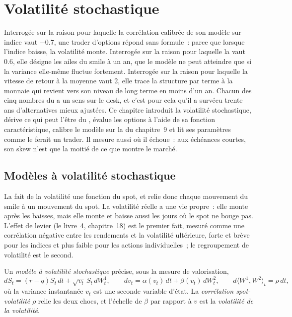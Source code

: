 \chapter{Volatilité stochastique}\label{ch:dv:stochastic-volatility}

Interrogée sur la raison pour laquelle la corrélation calibrée de son modèle sur indice vaut $-0.7$, une trader d'options répond
sans formule~: parce que lorsque l'indice baisse, la volatilité monte. Interrogée sur la raison pour laquelle la  vaut 0.6, elle désigne les ailes du smile à un an, que le modèle ne peut atteindre que si la variance elle-même fluctue fortement.
Interrogée sur la raison pour laquelle la vitesse de retour à la moyenne vaut 2, elle trace la
structure par terme à la monnaie qui revient vers son niveau de long terme en moins d'un an. Chacun des
cinq nombres du  a un sens sur le desk, et c'est pour cela qu'il a survécu
trente ans d'alternatives mieux ajustées. Ce chapitre introduit la volatilité stochastique,
dérive ce qui peut l'être du , évalue les options à l'aide de sa
fonction caractéristique, calibre le modèle sur la  du chapitre~9 et lit ses paramètres comme le ferait un trader.
Il mesure aussi où il échoue~: aux échéances courtes, son skew n'est que la moitié de
ce que montre le marché.

\section{Modèles à volatilité stochastique}

La  fait de la volatilité une fonction du spot, et relie donc chaque mouvement du smile à
un mouvement du spot. La volatilité réelle a une vie propre~: elle monte après les baisses, mais elle
monte et baisse aussi les jours où le spot ne bouge pas. L'effet de levier (le livre~4,
chapitre~18) est le premier fait, mesuré comme une corrélation négative entre les rendements et la
volatilité ultérieure, forte et brève pour les indices et plus faible pour les actions individuelles~; le regroupement de volatilité
est le second.

\begin{definition}\label{def:dv:stochastic-volatility:sv}
Un \emph{modèle à volatilité stochastique} précise, sous la
mesure de valorisation,
\[
dS_t=(r-q)S_t\,dt+\sqrt{v_t}\,S_t\,dW^1_t,\qquad dv_t=\alpha(v_t)\,dt+\beta(v_t)\,dW^2_t,\qquad
d\langle W^1,W^2\rangle_t=\rho\,dt,
\]
où la variance instantanée $v_t$ est une seconde variable d'état. La
\emph{corrélation spot-volatilité} $\rho$ relie les deux
chocs, et l'échelle de $\beta$ par rapport à $v$ est la \emph{volatilité de la
volatilité}.
\end{definition}

